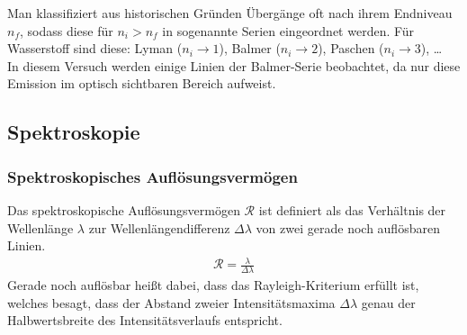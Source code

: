 \documentclass[11pt, a4paper]{article}
\numberwithin{equation}{section}
\begin{document}
Man klassifiziert aus historischen Gründen Übergänge oft nach ihrem Endniveau $n_f$, sodass diese für $n_i > n_f$ in sogenannte Serien eingeordnet werden.
Für Wasserstoff sind diese: Lyman ($n_i \rightarrow 1$), Balmer ($n_i \rightarrow 2$), Paschen ($n_i \rightarrow 3$), \dots\\
In diesem Versuch werden einige Linien der Balmer-Serie beobachtet, da nur diese Emission im optisch sichtbaren Bereich aufweist.

\subsection{Spektroskopie}
\subsubsection{Spektroskopisches Auflösungsvermögen}
\label{sssec:aufloesungsvermoegen}
Das spektroskopische Auflösungsvermögen $\mathcal{R}$ ist definiert als das Verhältnis der Wellenlänge $\lambda$ zur Wellenlängendifferenz $\Delta \lambda$ von zwei gerade noch auflösbaren Linien.
\begin{align}
\mathcal{R} = \frac{\lambda}{\Delta \lambda}
\label{eq:aufloesung}
\end{align}
Gerade noch auflösbar heißt dabei, dass das Rayleigh-Kriterium erfüllt ist, welches besagt, dass der Abstand zweier Intensitätsmaxima $\Delta \lambda$ genau der Halbwertsbreite des Intensitätsverlaufs entspricht.
\end{document}
